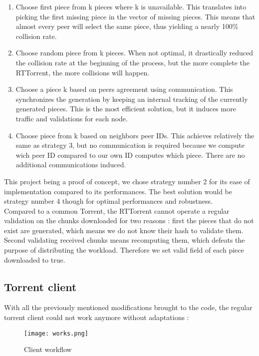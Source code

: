 \documentclass[a4paper]{article}
\begin{document}
{\begin{enumerate}
	\item Choose first piece from k pieces where k is unavailable. This translates into picking the first missing piece in the vector of missing pieces. This means that almost every peer will select the same piece, thus yielding a nearly  100\% collision rate.
	\item Choose random piece from k pieces. When not optimal, it drastically reduced the collision rate at the beginning of the process, but the more complete the RTTorrent, the more collisions will happen.
	\item Choose a piece k based on peers agreement using communication. This synchronizes the generation by keeping an internal tracking of the currently generated pieces. This is the most efficient solution, but it induces more traffic and validations for each node.
	\item Choose piece from k based on neighbors peer IDs. This achieves relatively the same as strategy 3, but no communication is required because we compute wich peer ID compared to our own ID computes which piece. There are no additional communications induced.
\end{enumerate}
\vspace{2mm}

This project being a proof of concept, we chose strategy number 2 for its ease of implementation compared to its performances. The best solution would be strategy number 4 though for optimal performances and robustness.\\

Compared to a common Torrent, the RTTorrent cannot operate a regular validation on the chunks downloaded for two reasons : first the pieces that do not exist are generated, which means we do not know their hash to validate them. Second validating received chunks means recomputing them, which defeats the purpose of distributing the workload. Therefore we set valid field of each piece downloaded to true.

\subsection{Torrent client}

With all the previously mentioned modifications brought to the code, the regular torrent client could not work anymore without adaptations :

\begin{figure}[H]
  \centering
    \texttt{[image: works.png]}
    \caption{Client workflow}
    \label{works}
\end{figure}
\vspace{2mm}

}
\end{document}
